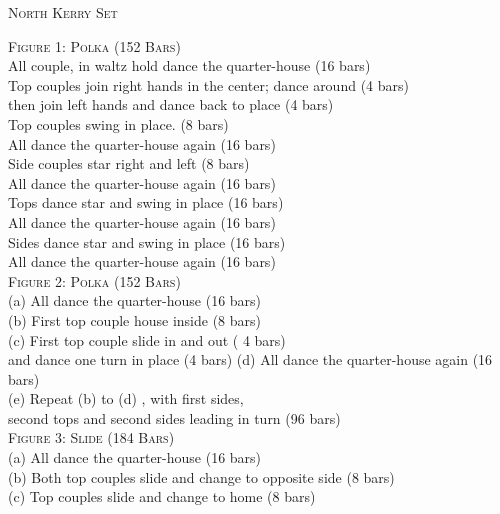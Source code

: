 \begin{center}
\textsc{North Kerry Set} \\
\end{center}


\small \textsc{Figure 1: Polka (152 Bars)}\\


\bodyText
All couple, in waltz hold dance the quarter-house (16 bars)\\
Top couples join right hands in the center; dance around (4 bars)\\
then join left hands and dance back to place (4 bars) \\
Top couples swing in place. (8 bars)\\
All dance the quarter-house again (16 bars) \\
Side couples star right and left  (8 bars) \\
All dance the quarter-house again (16 bars) \\
Tops dance star and swing in place  (16 bars) \\
All dance the quarter-house again (16 bars) \\
Sides dance star and swing in place  (16 bars) \\
All dance the quarter-house again (16 bars) \\

\small \textsc{Figure 2: Polka (152 Bars)}\\

\bodyText
(a) All dance the quarter-house (16 bars) \\
(b) First top couple house inside (8 bars) \\
(c) First top couple slide in and out ( 4 bars) \\
 and dance one turn in place (4 bars)
(d) All dance the quarter-house again (16 bars) \\
(e) Repeat (b) to (d) , with  first sides, \\
 second tops  and second sides leading in turn (96 bars)\\

\small \textsc{Figure 3: Slide (184 Bars)}\\

\bodyText
(a) All dance the quarter-house (16 bars) \\
(b) Both top couples slide and change to opposite side (8 bars)\\
(c) Top couples slide and change to home (8 bars) \\
